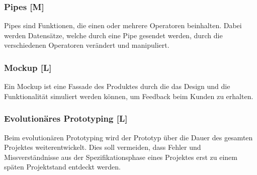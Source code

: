 \subsubsection{Pipes [M]}
\label{txt:glos:Pipes}
Pipes sind Funktionen, die einen oder mehrere Operatoren beinhalten. Dabei werden Datensätze, welche durch eine Pipe gesendet werden, durch die verschiedenen Operatoren verändert und manipuliert. \cite{Pipes}

\subsubsection{Mockup [L]}
Ein Mockup ist eine Fassade des Produktes durch die das Design und die Funktionalität simuliert werden können, um Feedback beim Kunden zu erhalten. \cite{Mokup}


\subsubsection{Evolutionäres Prototyping [L]}
\label{ch::ongoing-prototyping}
Beim evolutionären Prototyping wird der Prototyp über die Dauer des gesamten Projektes weiterentwickelt. Dies soll vermeiden, dass Fehler und Missverständnisse aus der Spezifikationsphase eines Projektes erst zu einem späten Projektstand entdeckt werden. \cite{Prototyping}
